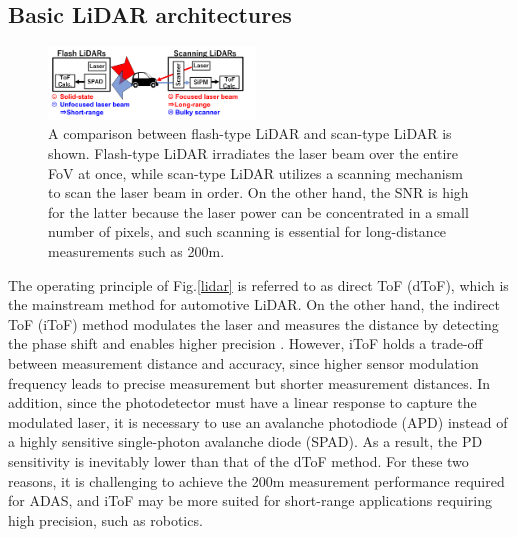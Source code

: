 \documentclass[paper]{ieice}
\begin{document}

\subsection{Basic LiDAR architectures}
\begin{figure}[!t]
\centering
 \includegraphics[width=0.49\textwidth]{figs/flashscan.png}
  \caption{A comparison between flash-type LiDAR and scan-type LiDAR is shown. Flash-type LiDAR irradiates the laser beam over the entire FoV at once, while scan-type LiDAR utilizes a scanning mechanism to scan the laser beam in order. On the other hand, the SNR is high for the latter because the laser power can be concentrated in a small number of pixels, and such scanning is essential for long-distance measurements such as 200m.}
\label{flash}
\end{figure}

\qquad The operating principle of Fig.\ref{lidar} is referred to as direct ToF (dToF), which is the mainstream method for automotive LiDAR. On the other hand, the indirect ToF (iToF) method modulates the laser and measures the distance by detecting the phase shift and enables higher precision \cite{kawahito2007cmos, bamji20140, bamji2018impixel, keel2019vga}. However, iToF holds a trade-off between measurement distance and accuracy, since higher sensor modulation frequency leads to precise measurement but shorter measurement distances. In addition, since the photodetector must have a linear response to capture the modulated laser, it is necessary to use an avalanche photodiode (APD) instead of a highly sensitive single-photon avalanche diode (SPAD). As a result, the PD sensitivity is inevitably lower than that of the dToF method. For these two reasons, it is challenging to achieve the 200m measurement performance required for ADAS, and iToF may be more suited for short-range applications requiring high precision, such as robotics\cite{yoshioka2021through}.
\end{document}
